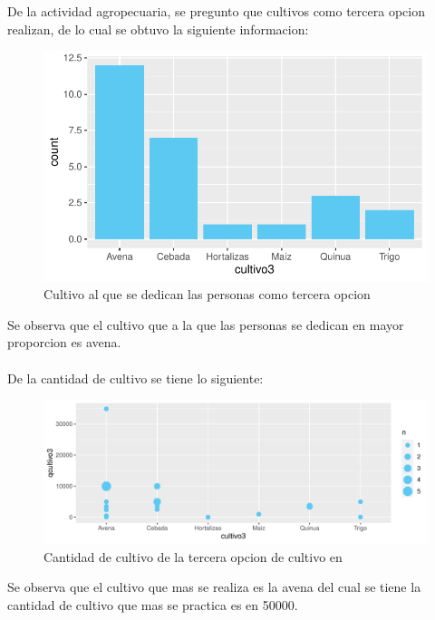 \documentclass[12pt]{article}\usepackage[]{graphicx}\usepackage[]{xcolor}
\makeatletter
\def\maxwidth{ %
  \ifdim\Gin@nat@width>\linewidth
    \linewidth
  \else
    \Gin@nat@width
  \fi
}
\newenvironment{knitrout}{}{} %
\makeatother
\begin{document}
	
	De la actividad agropecuaria, se pregunto que cultivos como tercera opcion realizan, de lo cual se obtuvo la siguiente informacion:
	\begin{figure}[H]
	\centering
\begin{knitrout}
\color{fgcolor}
\includegraphics[width=\maxwidth]{figure/thirteen-1} 
\end{knitrout}
	\caption{Cultivo al que se dedican las personas como tercera opcion}
	\end{figure}
	Se observa que el cultivo que a la que las personas se dedican en mayor proporcion es avena.\\
	\\
	De la cantidad de cultivo se tiene lo siguiente:
	\begin{figure}[H]
	\centering
\begin{knitrout}
\color{fgcolor}
\includegraphics[width=\maxwidth]{figure/fourteen-1} 
\end{knitrout}
	\caption{Cantidad de cultivo de la tercera opcion de cultivo en \comunidad}
	\end{figure}
	Se observa que el cultivo que mas se realiza es la avena del cual se tiene la cantidad de cultivo que mas se practica es en 50000.
	
\end{document}
